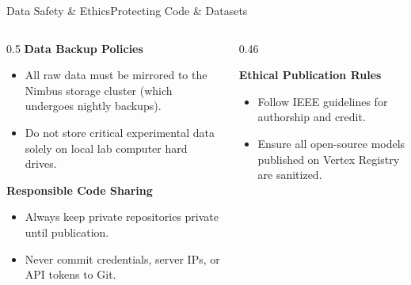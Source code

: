 \begin{frame}{Data Safety \& Ethics}{Protecting Code \& Datasets}
  \begin{columns}[T]
    \begin{column}{0.5\textwidth}
      \textbf{Data Backup Policies}
      \begin{itemize}
        \item All raw data must be mirrored to the Nimbus storage cluster (which undergoes nightly backups).
        \item Do not store critical experimental data solely on local lab computer hard drives.
      \end{itemize}
      
      \vspace{0.3cm}
      \textbf{Responsible Code Sharing}
      \begin{itemize}
        \item Always keep private repositories private until publication.
        \item Never commit credentials, server IPs, or API tokens to Git.
      \end{itemize}
    \end{column}
    
    \begin{column}{0.46\textwidth}
      \begin{accentbox}
        \textbf{Ethical Publication Rules}
        \begin{itemize}
          \item Follow IEEE guidelines for authorship and credit.
          \item Ensure all open-source models published on Vertex Registry are sanitized.
        \end{itemize}
      \end{accentbox}
    \end{column}
  \end{columns}
\end{frame}
